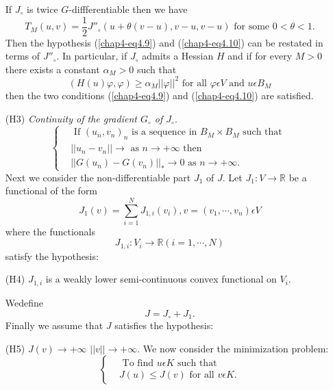 \begin{enumerate}
\begin{remark}\label{chap4-rem4.2}
If $J_{\circ}$ is twice $G$-diffferentiable then we have
$$
T_{M} (u, v) = \frac{1}{2} J''_{\circ} (u + \theta(v-u), v-u, v-u) \text{ for some } 0 < \theta < 1.
$$
Then the hypothesis (\ref{chap4-eq4.9}) and (\ref{chap4-eq4.10}) can be restated in terms of $J''_{\circ}$. In particular, if $J_{\circ}$ admits a Hessian $H$ and if for every $M > 0$ there exists a constant $\alpha_{M} > 0$ such that
$$
(H(u)\varphi, \varphi) \geq \alpha_{M} ||\varphi||^{2} \text{ for all } \varphi \epsilon V \text{ and } u \epsilon B_{M} 
$$
then the two conditions (\ref{chap4-eq4.9}) and (\ref{chap4-eq4.10}) are satisfied.
\end{remark}
\item[(H3)] {\em Continuity of the gradient $G_{\circ}$ of $J_{\circ}$}.
\begin{equation*}
\begin{cases}
& \text{ If } (u_{n}, v_{n})_{n} \text{ is a sequence in } B_{M} \times B_{M} \text{ such that }\\
& ||u_{n}-v_{n}|| \to \text{ as } n \to + \infty \text{ then}\\
& ||G(u_{n}) - G(v_{n})||_{*} \to 0 \text{ as } n \to + \infty.\tag{4.11}\label{chap4-eq4.11}
\end{cases}
\end{equation*}
Next we consider the non-differentiable part $J_{1}$ of $J$. Let $J_{1} : V \to \mathbb{R}$ be a functional of the form
\begin{equation*}
J_{1} (v) = \sum_{i=1}^{N} J_{1, i} (v_{i}), v = (v_{1}, \cdots , v_{n}) \epsilon V\tag{4.12}\label{chap4-eq4.12}
\end{equation*}
where the functionals
$$
J_{1, i} : V_{i} \to \mathbb{R} (i = 1, \cdots , N)
$$
satisfy the hypothesis:
\item[(H4)] $J_{1, i}$ is a weakly lower semi-continuous convex functional on $V_{i}$.

We\pageoriginale define
\begin{equation*}
J = J_{\circ} + J_{1}.\tag{4.13}\label{chap4-eq4.13}
\end{equation*}
Finally we assume that $J$ satisfies the hypothesis:

\item[(H5)] $J(v) \to + \infty$  $||v|| \to + \infty$.
We now consider the minimization problem:
\begin{equation*}
\begin{cases}
& \text{ To find } u \epsilon K \text{ such that }\\
& J(u) \leq J(v) \text{ for all } v \epsilon K.\tag{4.14}\label{chap4-eq4.14}
\end{cases}
\end{equation*}
\end{enumerate}

